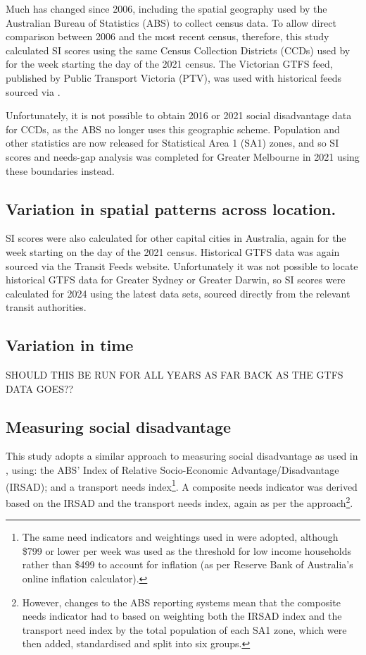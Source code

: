 \documentclass[preprint, 3p,
authoryear]{elsarticle} %
\begin{document}
Much has changed since 2006, including the spatial geography used by the
Australian Bureau of Statistics (ABS) to collect census data. To allow
direct comparison between 2006 and the most recent census, therefore,
this study calculated SI scores using the same Census Collection
Districts (CCDs) used by \citet{currie2010identifying} for the week
starting the day of the 2021 census. The Victorian GTFS feed, published
by Public Transport Victoria (PTV), was used with historical feeds
sourced via \citet{transitfeeds_victoria:2023aa}.

Unfortunately, it is not possible to obtain 2016 or 2021 social
disadvantage data for CCDs, as the ABS no longer uses this geographic
scheme. Population and other statistics are now released for Statistical
Area 1 (SA1) zones, and so SI scores and needs-gap analysis was
completed for Greater Melbourne in 2021 using these boundaries instead.

\subsection{Variation in spatial patterns across
location.}\label{variation-in-spatial-patterns-across-location.}

SI scores were also calculated for other capital cities in Australia,
again for the week starting on the day of the 2021 census. Historical
GTFS data was again sourced via the Transit Feeds website. Unfortunately
it was not possible to locate historical GTFS data for Greater Sydney or
Greater Darwin, so SI scores were calculated for 2024 using the latest
data sets, sourced directly from the relevant transit authorities.

\subsection{Variation in time}\label{variation-in-time}

SHOULD THIS BE RUN FOR ALL YEARS AS FAR BACK AS THE GTFS DATA GOES??

\subsection{Measuring social
disadvantage}\label{measuring-social-disadvantage}

This study adopts a similar approach to measuring social disadvantage as
used in \citet{currie2010identifying}, using: the ABS' Index of Relative
Socio-Economic Advantage/Disadvantage (IRSAD); and a transport needs
index\footnote{The same need indicators and weightings used in
  \citet{currie2010identifying} were adopted, although \$799 or lower
  per week was used as the threshold for low income households rather
  than \$499 to account for inflation (as per Reserve Bank of
  Australia's online inflation calculator).}. A composite needs
indicator was derived based on the IRSAD and the transport needs index,
again as per the \citet{currie2010identifying} approach\footnote{However,
  changes to the ABS reporting systems mean that the composite needs
  indicator had to based on weighting both the IRSAD index and the
  transport need index by the total population of each SA1 zone, which
  were then added, standardised and split into six groups.}.
\end{document}
